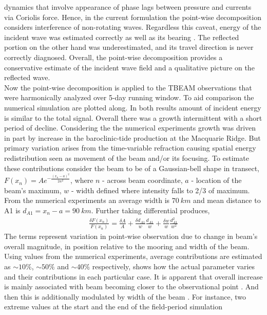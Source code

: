 \documentclass[12pt]{article}
\begin{document}
dynamics that involve appearance of phase lags between pressure and currents via Coriolis force. 
Hence, in the current formulation the point-wise decomposition considers interference of 
non-rotating waves. Regardless this caveat, energy of the incident wave was estimated 
correctly as well as its bearing . The reflected portion on the 
other hand was underestimated, and its travel direction is never correctly diagnosed. Overall, the 
point-wise decomposition provides a conservative estimate of the incident wave field and a 
qualitative picture on the reflected wave.\\
Now the point-wise decomposition is applied to the TBEAM observations  
that were harmonically analyzed over 5-day running window. To aid comparison the 
numerical simulation are plotted along. In both results amount of incident energy is similar to the 
total signal. Overall there was a growth intermittent with a short period of decline. Considering 
the the numerical experiments growth was driven in part by increase in the baroclinic-tide 
production at the Macquarie Ridge. But primary variation arises 
from the time-variable refraction causing spatial energy redistribution seen as 
movement of the beam and/or its focusing. To estimate these contributions consider the beam to 
be of a Gaussian-bell shape in transect, $F(x_n) = A e^{-\frac{(x_n - a)^2}{2w^2}}$, where $n$ - 
across beam coordinate, $a$ - location of the beam's maximum, $w$ - width defined where intensity 
falls to 2/3 of maximum. From the numerical experiments an average width is $70~km$ and mean 
distance to A1 is $d_{A1} = x_n - a = 90~km$. Further taking differential produces,
\begin{align}
\frac{\delta F(x_n)}{F(x_n)} = \frac{\delta A}{A} + \frac{\delta d_{A1}}{w} \frac{d_{A1}}{w} + 
\frac{\delta w}{w} \frac{d_{A1}^2}{w^2}
\end{align}
The terms represent variation in point-wise observation due to change in beam's overall magnitude, 
in position relative to the mooring and width of the beam. Using values from the numerical 
experiments, average contributions are estimated as $\sim 10\%$, $\sim 50\%$ and $\sim 40\%$ 
respectively,  shows how the actual parameter varies and their 
contributions in each particular case. It is apparent that overall increase is mainly associated 
with beam becoming closer to the observational point . 
And then this is additionally modulated by width of the beam . For instance, two extreme values at the start and the end of the field-period simulation  
\end{document}
